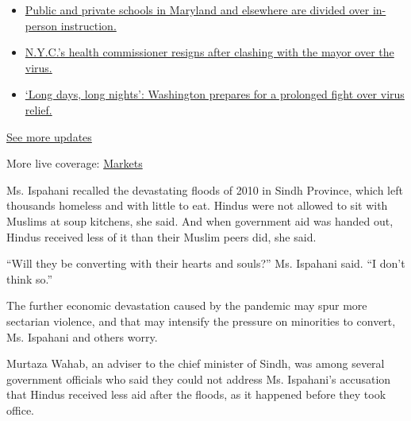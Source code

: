\begin{itemize}
\tightlist
\item
  \href{https://www.nytimes3xbfgragh.onion/2020/08/04/world/coronavirus-cases.html?action=click\&pgtype=Article\&state=default\&region=MAIN_CONTENT_1\&context=storylines_live_updates\#link-4825b93}{Public
  and private schools in Maryland and elsewhere are divided over
  in-person instruction.}
\item
  \href{https://www.nytimes3xbfgragh.onion/2020/08/04/world/coronavirus-cases.html?action=click\&pgtype=Article\&state=default\&region=MAIN_CONTENT_1\&context=storylines_live_updates\#link-4d1eafa8}{N.Y.C.'s
  health commissioner resigns after clashing with the mayor over the
  virus.}
\item
  \href{https://www.nytimes3xbfgragh.onion/2020/08/04/world/coronavirus-cases.html?action=click\&pgtype=Article\&state=default\&region=MAIN_CONTENT_1\&context=storylines_live_updates\#link-6b644638}{`Long
  days, long nights': Washington prepares for a prolonged fight over
  virus relief.}
\end{itemize}

\href{https://www.nytimes3xbfgragh.onion/2020/08/04/world/coronavirus-cases.html?action=click\&pgtype=Article\&state=default\&region=MAIN_CONTENT_1\&context=storylines_live_updates}{See
more updates}

More live coverage:
\href{https://www.nytimes3xbfgragh.onion/live/2020/08/04/business/stock-market-today-coronavirus?action=click\&pgtype=Article\&state=default\&region=MAIN_CONTENT_1\&context=storylines_live_updates}{Markets}

Ms. Ispahani recalled the devastating floods of 2010 in Sindh Province,
which left thousands homeless and with little to eat. Hindus were not
allowed to sit with Muslims at soup kitchens, she said. And when
government aid was handed out, Hindus received less of it than their
Muslim peers did, she said.

``Will they be converting with their hearts and souls?'' Ms. Ispahani
said. ``I don't think so.''

The further economic devastation caused by the pandemic may spur more
sectarian violence, and that may intensify the pressure on minorities to
convert, Ms. Ispahani and others worry.

Murtaza Wahab, an adviser to the chief minister of Sindh, was among
several government officials who said they could not address Ms.
Ispahani's accusation that Hindus received less aid after the floods, as
it happened before they took office.


